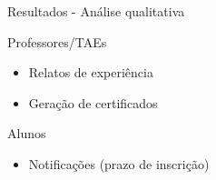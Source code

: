 \begin{frame}{{\sffamily Resultados - Análise qualitativa}}
  \begin{block}{Professores/TAEs}
    \begin{itemize}
      \item Relatos de experiência
      \item Geração de certificados
    \end{itemize}
  \end{block}
  \begin{block}{Alunos}
    \begin{itemize}
      \item Notificações (prazo de inscrição)
    \end{itemize}
  \end{block}
\end{frame}